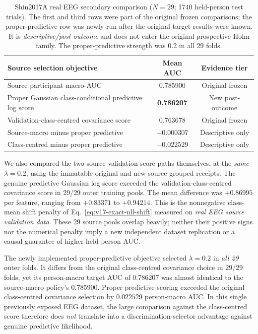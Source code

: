 \begin{table}[tb]
\centering
\small
\caption{Shin2017A real EEG secondary comparison (\(N=29\);
1740 held-person test trials). The first and third rows were
part of the original frozen comparisons; the proper-predictive
row was newly run after the original target results were known.
It is \emph{descriptive/post-outcome} and does not enter
the original prospective Holm family. The proper-predictive
strength was 0.2 in all 29 folds.}
\label{tab:v18-real-predictive}
\begin{tabular}{lcc}
\toprule
Source selection objective & Mean AUC & Evidence tier\\
\midrule
Source participant macro-AUC & 0.785900 & Original frozen\\
Proper Gaussian class-conditional predictive log score &
 \textbf{0.786207} & New post-outcome\\
Validation-class-centred covariance score & 0.763678 & Original frozen\\
\midrule
Source-macro minus proper predictive & $-0.000307$ &
 Descriptive only\\
Class-centred minus proper predictive & $-0.022529$ &
 Descriptive only\\
\bottomrule
\end{tabular}
\end{table}

We also compared the two source-validation score
paths themselves, at the \emph{same} $\lambda=0.2$,
using the immutable original and new source-grouped
receipts. The genuine predictive Gaussian log score
exceeded the validation-class-centred covariance score
in 29/29 outer training pools. The mean difference
was $+0.86995$ per feature, ranging from $+0.83371$
to $+0.94214$. This is the nonnegative class-mean
shift penalty of Eq.~\eqref{eq:v17-exact-nll-shift}
measured on \emph{real EEG source validation data}.
These 29 source pools overlap heavily; neither their
positive signs nor the numerical penalty imply
a new independent dataset replication or a causal
guarantee of higher held-person AUC.

The newly implemented proper-predictive objective selected
\(\lambda=0.2\) in \emph{all 29} outer folds. It differs from the
original class-centred covariance choice in 29/29 folds, yet its
person-macro target AUC of \(0.786207\) was almost identical
to the source-macro policy's \(0.785900\). Proper predictive
scoring exceeded the original class-centred covariance
selection by \(0.022529\) person-macro AUC. In this
single previously exposed EEG dataset, the large comparison
against the class-centred score therefore does
\emph{not} translate into a discrimination-selector advantage
against genuine predictive likelihood.

